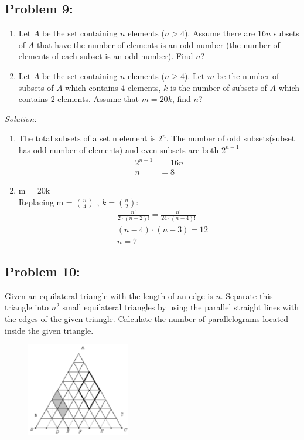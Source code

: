 \documentclass[a4paper]{article}
\begin{document}
	\subsection*{Problem 9:}
	\begin{enumerate}
		\item Let $A$ be the set containing $n$ elements ($n > 4$). Assume there are $16n$ subsets of $A$ that have the number of elements is an odd number (the number of elements of each subset is an odd number). Find $n$?
		\item Let $A$ be the set containing $n$ elements ($n \geq 4$). Let $m$ be the number of subsets of $A$ which contains 4 elements, $k$ is the number of subsets of $A$ which contains 2 elements. Assume that $m = 20k$, find $n$?
	\end{enumerate}
	
	\textit{Solution:}
	\begin{enumerate}
		\item 
		The total subsets of a set n element is $2^n$.
		The number of odd subsets(subset has odd number of elements) and even subsets are both $2^{n-1}$
		\begin{align*}
		2^{n-1} &= 16n \\
		n &= 8
		\end{align*}
		\item m  = 20k\\
		Replacing m = ${n \choose 4}$ ,  $k = {n \choose 2}$:
		\begin{align*}
		&\frac{n!}{2\cdot(n-2)!} = \frac{n!}{24\cdot(n-4)!} \\
		&(n-4)\cdot(n-3) = 12 \\
		&n = 7
		\end{align*}
	\end{enumerate}
	
	\subsection*{Problem 10:}
	Given an equilateral triangle with the length of an edge is $n$. Separate this triangle into $n^2$ small equilateral triangles by using the parallel straight lines with the edges of the given triangle. Calculate the number of parallelograms located inside the given triangle.
	\begin{figure}[H]
		\centering
		\includegraphics[width=0.4\textwidth]{cprob10.png}
	\end{figure}
	
\end{document}
